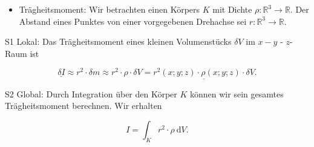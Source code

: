 \documentclass[10pt]{article}
\begin{document}
\begin{itemize}
  \item Trägheitsmoment: Wir betrachten einen Körpers $K$ mit Dichte $\rho: \mathbb{R}^{3} \rightarrow \mathbb{R}$. Der Abstand eines Punktes von einer vorgegebenen Drehachse sei $r: \mathbb{R}^{3} \rightarrow \mathbb{R}$.
\end{itemize}

S1 Lokal: Das Trägheitsmoment eines kleinen Volumenstücks $\delta V$ im $x-y$ - $z$-Raum ist


\begin{equation*}
\underline{\delta I} \approx r^{2} \cdot \delta m \approx r^{2} \cdot \rho \cdot \delta V=\underline{r^{2}(x ; y ; z) \cdot \rho(x ; y ; z) \cdot \delta V} . \tag{2.96}
\end{equation*}


S2 Global: Durch Integration über den Körper $K$ können wir sein gesamtes Trägheitsmoment berechnen. Wir erhalten


\begin{equation*}
I=\int_{K} r^{2} \cdot \rho \mathrm{~d} V . \tag{2.97}
\end{equation*}
\end{document}
